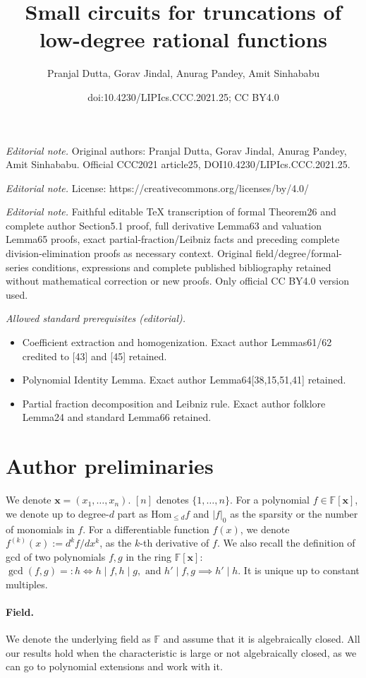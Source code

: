 \documentclass[10pt,a4paper]{article}
\title{Small circuits for truncations of low-degree rational functions}
\author{Pranjal Dutta, Gorav Jindal, Anurag Pandey, Amit Sinhababu}
\date{doi:10.4230/LIPIcs.CCC.2021.25; CC BY4.0}
\begin{document}
\maketitle
\noindent\textit{Editorial note.} Original authors: Pranjal Dutta, Gorav Jindal, Anurag Pandey, Amit Sinhababu. Official CCC2021 article25, DOI10.4230/LIPIcs.CCC.2021.25.\par\medskip
\noindent\textit{Editorial note.} License: https://creativecommons.org/licenses/by/4.0/\par\medskip
\noindent\textit{Editorial note.} Faithful editable TeX transcription of formal Theorem26 and complete author Section5.1 proof, full derivative Lemma63 and valuation Lemma65 proofs, exact partial-fraction/Leibniz facts and preceding complete division-elimination proofs as necessary context. Original field/degree/formal-series conditions, expressions and complete published bibliography retained without mathematical correction or new proofs. Only official CC BY4.0 version used.\par\medskip
\noindent\textit{Allowed standard prerequisites (editorial).}\begin{itemize}
\item Coefficient extraction and homogenization. Exact author Lemmas61/62 credited to [43] and [45] retained.
\item Polynomial Identity Lemma. Exact author Lemma64[38,15,51,41] retained.
\item Partial fraction decomposition and Leibniz rule. Exact author folklore Lemma24 and standard Lemma66 retained.
\end{itemize}\medskip
\section*{Author preliminaries}
We denote $\mathbf x=(x_1,\ldots,x_n)$. $[n]$ denotes $\{1,\ldots,n\}$. For a polynomial $f\in\mathbb F[\mathbf x]$, we denote up to degree-$d$ part as $\mathrm{Hom}_{\le d}f$ and $|f|_0$ as the sparsity or the number of monomials in $f$. For a differentiable function $f(x)$, we denote $f^{(k)}(x):=d^kf/dx^k$, as the $k$-th derivative of $f$. We also recall the definition of gcd of two polynomials $f,g$ in the ring $\mathbb F[\mathbf x]$: $\gcd(f,g)=:h\iff h\mid f,h\mid g,\text{ and }h'\mid f,g\implies h'\mid h$. It is unique up to constant multiples.
\paragraph{Field.} We denote the underlying field as $\mathbb F$ and assume that it is algebraically closed. All our results hold when the characteristic is large or not algebraically closed, as we can go to polynomial extensions and work with it.
\end{document}
